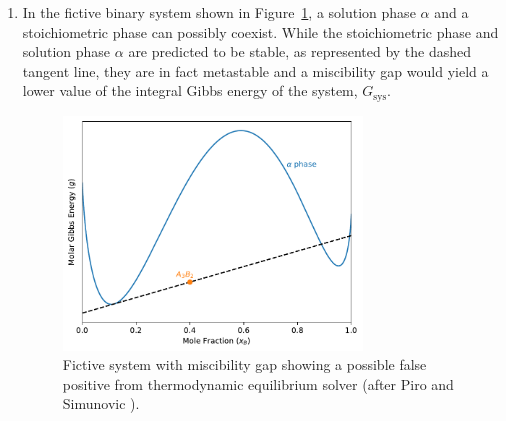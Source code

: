 	\begin{enumerate}
	\item In the fictive binary system shown in Figure~\ref{fig:go_sys-AB}, a solution phase $\alpha$ and a stoichiometric phase  can possibly coexist. While the stoichiometric phase  and solution phase $\alpha$ are predicted to be stable, as represented by the dashed tangent line, they are in fact metastable and a miscibility gap would yield a lower value of the integral Gibbs energy of the system, $G_\text{sys}$.
		\begin{figure}[htbp]
			\centering
			\includegraphics[width=0.75\textwidth]{figures/chapter-4/System_AB.pdf}
			\caption[Fictive system with miscibility gap showing a possible false positive from thermodynamic equilibrium solver.]{Fictive system with miscibility gap showing a possible false positive from thermodynamic equilibrium solver (after Piro and Simunovic \cite{Piro16}).}
			\label{fig:go_sys-AB}
		\end{figure}


\end{enumerate}
